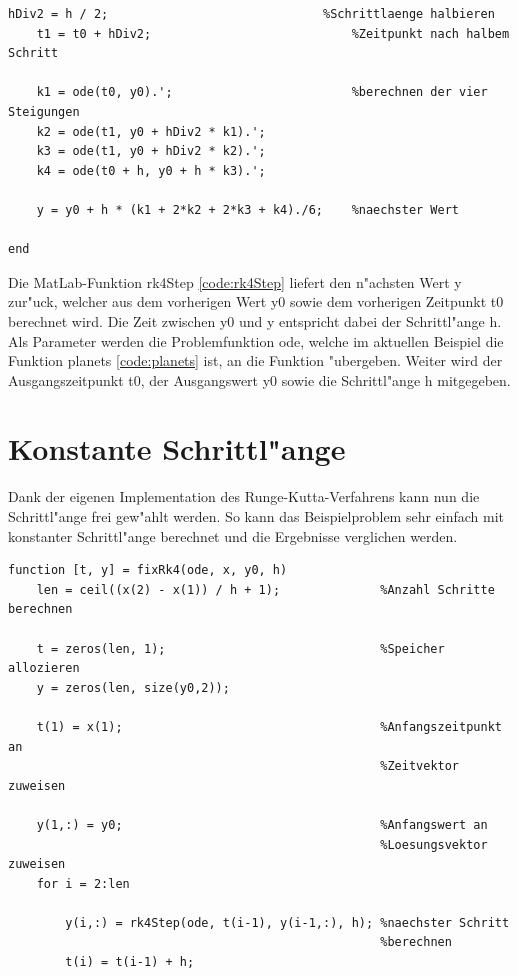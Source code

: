 \begin{refsection}
\begin{lstlisting}[style=Matlab, caption=Runge-Kutta-Schritt, captionpos=b, label=code:rk4Step]
    hDiv2 = h / 2;                              %Schrittlaenge halbieren
    t1 = t0 + hDiv2;                            %Zeitpunkt nach halbem Schritt

    k1 = ode(t0, y0).';                         %berechnen der vier Steigungen
    k2 = ode(t1, y0 + hDiv2 * k1).';               
    k3 = ode(t1, y0 + hDiv2 * k2).';
    k4 = ode(t0 + h, y0 + h * k3).';
    
    y = y0 + h * (k1 + 2*k2 + 2*k3 + k4)./6;    %naechster Wert

end
\end{lstlisting}
Die MatLab-Funktion rk4Step \ref{code:rk4Step} liefert den n"achsten Wert y zur"uck, welcher aus dem vorherigen Wert y0 sowie dem vorherigen Zeitpunkt t0 berechnet wird.
Die Zeit zwischen y0 und y entspricht dabei der Schrittl"ange h.
Als Parameter werden die Problemfunktion ode, welche im aktuellen Beispiel die Funktion planets \ref{code:planets} ist, an die Funktion "ubergeben.
Weiter wird der Ausgangszeitpunkt t0, der Ausgangswert y0 sowie die Schrittl"ange h mitgegeben.
 
\section{Konstante Schrittl"ange}

Dank der eigenen Implementation des Runge-Kutta-Verfahrens kann nun die Schrittl"ange frei gew"ahlt werden.
So kann das Beispielproblem sehr einfach mit konstanter Schrittl"ange berechnet und die Ergebnisse verglichen werden. 
\begin{lstlisting}[style=Matlab, caption=Konstante Schrittl"ange, captionpos=b, label=code:fixRk4] 
function [t, y] = fixRk4(ode, x, y0, h)                 
    len = ceil((x(2) - x(1)) / h + 1);              %Anzahl Schritte berechnen

    t = zeros(len, 1);                              %Speicher allozieren
    y = zeros(len, size(y0,2));

    t(1) = x(1);                                    %Anfangszeitpunkt an
                                                    %Zeitvektor zuweisen
                                                        
    y(1,:) = y0;                                    %Anfangswert an
                                                    %Loesungsvektor zuweisen
    for i = 2:len
  
        y(i,:) = rk4Step(ode, t(i-1), y(i-1,:), h); %naechster Schritt
                                                    %berechnen
        t(i) = t(i-1) + h;                             


\end{lstlisting}
\end{refsection}
